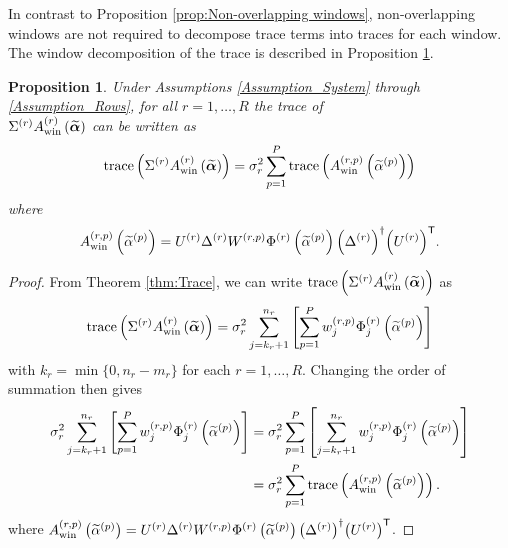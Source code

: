 \documentclass[12pt]{article}
\newtheorem{proposition}{Proposition}[section]
\begin{document}
In contrast to Proposition \ref{prop:Non-overlapping windows}, non-overlapping windows are not required to decompose trace terms into traces for each window. The window decomposition of the trace is described in Proposition \ref{prop:Window Trace}.

\begin{proposition}
\label{prop:Window Trace}
Under Assumptions \ref{Assumption_System} through \ref{Assumption_Rows}, for all $r = 1,\ldots,R$ the trace of \\ $\Sigma^{(r)}A_{\text{win}}^{(r)}\left(\widetilde{\bm{\alpha}}\right)$ can be written as
\[\operatorname{trace}\left(\Sigma^{(r)}A_{\text{win}}^{(r)}\left(\widetilde{\bm{\alpha}}\right)\right) = \sigma_r^2 \sum_{p=1}^P \operatorname{trace}\left(A_{\text{win}}^{(r,p)}\left(\widetilde{\alpha}^{(p)}\right)\right)\]
where
\[A_{\text{win}}^{(r,p)}\left(\widetilde{\alpha}^{(p)}\right) = U^{(r)}\Delta^{(r)}W^{(r,p)}\Phi^{(r)}\left(\widetilde{\alpha}^{(p)}\right){\left(\Delta^{(r)}\right)}^\dagger{\left(U^{(r)}\right)}^\mathsf{T}.\]
\end{proposition}
\begin{proof}
From Theorem \ref{thm:Trace}, we can write $\operatorname{trace}\left(\Sigma^{(r)}A_{\text{win}}^{(r)}\left(\widetilde{\bm{\alpha}}\right)\right)$ as
\[\operatorname{trace}\left(\Sigma^{(r)}A_{\text{win}}^{(r)}\left(\widetilde{\bm{\alpha}}\right)\right) = \sigma_r^2 \sum_{j = k_r + 1}^{n_r} \left[\sum_{p=1}^{P} w_j^{(r,p)} \Phi_j^{(r)}\left(\widetilde{\alpha}^{(p)}\right)\right]\]
with $k_r = \min\{0,n_r - m_r\}$ for each $r = 1,\ldots,R$. Changing the order of summation then gives
\begin{align*}
\sigma_r^2 \sum_{j = k_r + 1}^{n_r} \left[\sum_{p=1}^{P} w_j^{(r,p)} \Phi_j^{(r)}\left(\widetilde{\alpha}^{(p)}\right)\right] &= \sigma_r^2 \sum_{p=1}^{P} \left[\sum_{j = k_r + 1}^{n_r} w_j^{(r,p)} \Phi_j^{(r)}\left(\widetilde{\alpha}^{(p)}\right)\right] \\
&= \sigma_r^2 \sum_{p=1}^{P} \operatorname{trace}\left(A_{\text{win}}^{(r,p)}\left(\widetilde{\alpha}^{(p)}\right)\right).
\end{align*}
where $A_{\text{win}}^{(r,p)}\left(\widetilde{\alpha}^{(p)}\right) = U^{(r)}\Delta^{(r)}W^{(r,p)}\Phi^{(r)}\left(\widetilde{\alpha}^{(p)}\right){\left(\Delta^{(r)}\right)}^\dagger{\left(U^{(r)}\right)}^\mathsf{T}$.
\end{proof}
\end{document}
